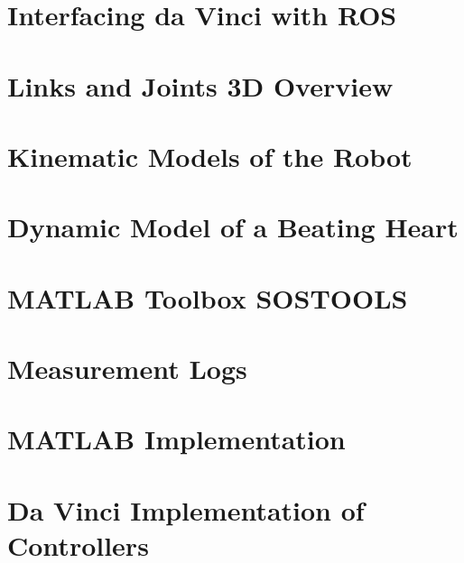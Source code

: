 \begin{appendices}
\appendix
\renewcommand{\appendixname}{Appendix}
\renewcommand{\appendixtocname}{Appendix}

\label{appendixbegin}

\chapter{Interfacing da Vinci with ROS}\label{app:ros}


\chapter{Links and Joints 3D Overview}\label{app:links_joints_3d}


\chapter{Kinematic Models of the Robot}\label{app:kinematic_model_robot}


\chapter{Dynamic Model of a Beating Heart}\label{app:dynamic_model_heart}


\chapter{MATLAB Toolbox SOSTOOLS}\label{app:sostools}


\chapter{Measurement Logs}\label{app:meas}



\chapter{MATLAB Implementation}\label{app:slide_implement_1}



\chapter{Da Vinci Implementation of Controllers}\label{app:slide_implement_2}



\end{appendices}
